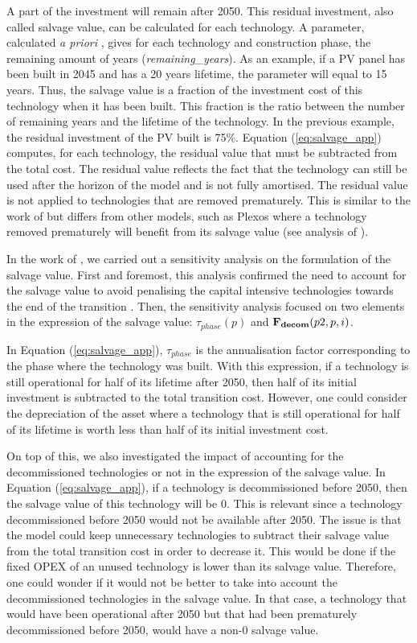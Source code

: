 A part of the investment will remain after 2050. This residual investment, also called salvage value, can be calculated for each technology. 
A parameter, calculated \textit{a priori} , gives for each technology and construction phase, the remaining amount of years (\emph{remaining\_years}). 
As an example, if a PV panel has been built in 2045 and has a 20 years lifetime, the parameter will equal to 15 years. 
Thus, the salvage value is a fraction of the investment cost of this technology when it has been built. 
This fraction is the ratio between the number of remaining years and the lifetime of the technology. 
In the previous example, the residual investment of the PV built is 75\%. 
Equation (\ref{eq:salvage_app}) computes, for each technology, the residual value that must be subtracted from the total cost. The residual value reflects the fact that the technology can still be used after the horizon of the model and is not fully amortised. The residual value is not applied to technologies that are removed prematurely. This is similar to the work of \citet{prina2019transition} but differs from other models, such as Plexos where a technology removed prematurely will benefit from its salvage value (see analysis of \cite{waucquez2023validation}).

In the work of \citet{goffauxpathway}, we carried out a sensitivity analysis on the formulation of the salvage value. First and foremost, this analysis confirmed the need to account for the salvage value to avoid penalising the capital intensive technologies towards the end of the transition \cite{poncelet2016myopic}. Then, the sensitivity analysis focused on two elements in the expression of the salvage value: $\tau_{phase}(p)$ and $\textbf{F\textsubscript{decom}}(p2,p,i)$. 

In Equation (\ref{eq:salvage_app}), $\tau_{phase}$ is the annualisation factor corresponding to the phase where the technology was built. With this expression, if a technology is still operational for half of its lifetime after 2050, then half of its initial investment is subtracted to the total transition cost. However, one could consider the depreciation of the asset where a technology that is still operational for half of its lifetime is worth less than half of its initial investment cost. 

On top of this, we also investigated the impact of accounting for the decommissioned technologies or not in the expression of the salvage value.  In Equation (\ref{eq:salvage_app}), if a technology is decommissioned before 2050, then the salvage value of this technology will be 0. This is relevant since a technology decommissioned before 2050 would not be available after 2050. The issue is that the model could keep unnecessary technologies to subtract their salvage value from the total transition cost in order to decrease it. This would be done if the fixed OPEX of an unused technology is lower than its salvage value. Therefore, one could wonder if it would not be better to take into account the decommissioned technologies in the salvage value. In that case, a technology that would have been operational after 2050 but that had been prematurely decommissioned before 2050, would have a non-0 salvage value.

